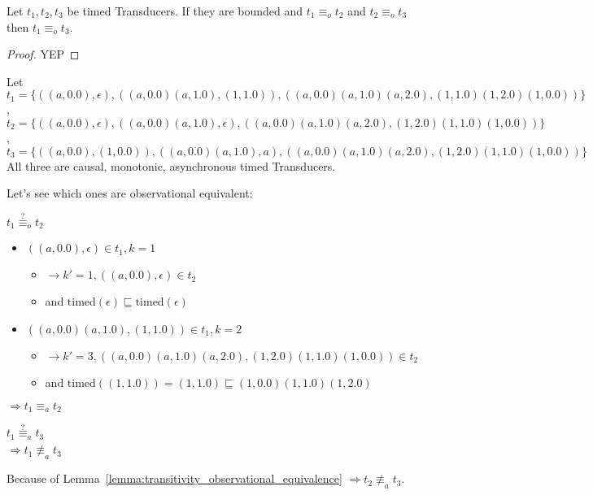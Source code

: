 \begin{lemma}[name=Transitivity of observational Equivalence]\label{lemma:transitivity_observational_equivalence}
  Let \(t_1, t_2, t_3\) be timed Transducers.
  If they are bounded and \(t_1 \equiv_o t_2\) and \(t_2 \equiv_o t_3\) then \(t_1 \equiv_o t_3\).
\end{lemma}
\begin{proof}
  YEP
\end{proof}

\begin{exmp}[name=Observational Equivalence]\label{exmp:observational_equivalence}
  Let \(t_1 = \{((a,0.0), \epsilon),((a,0.0)(a,1.0), (1,1.0)),((a,0.0)(a,1.0)(a,2.0), (1,1.0)(1,2.0)(1,0.0))\}\), \\
  \(t_2 = \{((a,0.0), \epsilon),((a,0.0)(a,1.0), \epsilon),((a,0.0)(a,1.0)(a,2.0), (1,2.0)(1,1.0)(1,0.0))\}\), \\
  \(t_3 = \{((a,0.0), (1,0.0)),((a,0.0)(a,1.0), a),((a,0.0)(a,1.0)(a,2.0), (1,2.0)(1,1.0)(1,0.0))\}\)
  All three are causal, monotonic, asynchronous timed Transducers.

  Let's see which ones are observational equivalent:

  \(t_1 \stackrel{?}{\equiv}_o t_2\)
  \begin{itemize}[label={}]
    \item \(((a,0.0), \epsilon)             \in t_1, k = 1\)
      \begin{itemize}[label={}]
        \item \(\rightarrow k' = 1, ((a,0.0), \epsilon)     \in t_2\)
        \item and \(\text{timed}(\epsilon)  \sqsubseteq \text{timed}(\epsilon)\)
      \end{itemize}
    \item \(((a,0.0)(a,1.0), (1,1.0))       \in t_1, k = 2\)
      \begin{itemize}[label={}]
        \item \(\rightarrow k' = 3, ((a,0.0)(a,1.0)(a,2.0), (1,2.0)(1,1.0)(1,0.0))    \in t_2\)
        \item and \(\text{timed}((1,1.0))=(1,1.0)   \sqsubseteq (1,0.0)(1,1.0)(1,2.0)\)
      \end{itemize}
  \end{itemize}
  \(\Rightarrow t_1 \equiv_a t_2\)

  \(t_1 \stackrel{?}{\equiv}_a t_3\)
  \begin{align*}
  \end{align*}
  \(\Rightarrow t_1 \not\equiv_a t_3\)

  Because of Lemma~\ref{lemma:transitivity_observational_equivalence} \(\Rightarrow t_2 \not\equiv_a t_3\).

\end{exmp}




